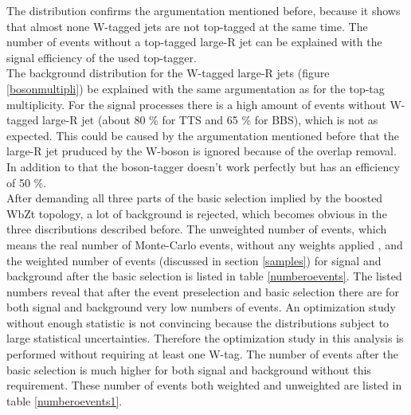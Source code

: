 The distribution confirms the argumentation mentioned before, because it shows that almost none W-tagged jets are not top-tagged at the same time.
The number of events without a top-tagged large-R jet can be explained with the signal efficiency of the used top-tagger.\\
The background distribution for the W-tagged large-R jets (figure \ref{bosonmultipli}) be explained with the same argumentation as for the top-tag multiplicity.
For the signal processes there is a high amount of events without W-tagged large-R jet (about 80 \% for TTS and 65 \% for BBS), which is not as expected.
This could be caused by the argumentation mentioned before that the large-R jet pruduced by the W-boson is ignored because of the overlap removal.
In addition to that the boson-tagger doesn't work perfectly but has an efficiency of 50 \%.\\
After demanding all three parts of the basic selection implied by the boosted WbZt topology, a lot of background is rejected, which becomes obvious in the three discributions described before.
The unweighted number of events, which means the real number of Monte-Carlo events, without any weights applied , and the weighted number of events (discussed in section \ref{samples}) for signal and background after the basic selection is listed in table \ref{numberoevents}.
The listed numbers reveal that after the event preselection and basic selection there are for both signal and background very  low numbers of events.
An optimization study without enough statistic is not convincing because the distributions subject to large statistical uncertainties.
Therefore the optimization study in this analysis is performed without requiring at least one W-tag.
The number of events after the basic selection is much higher for both signal and background without this requirement.
These number of events both weighted and unweighted are listed in table \ref{numberoevents1}.

\begin{table}
\centering
\caption{Unweighted and weighted number of events for signal and background processes after requiring two large-R jets and both top- and W-tag.}
\label{numberoevents}
\end{table}




